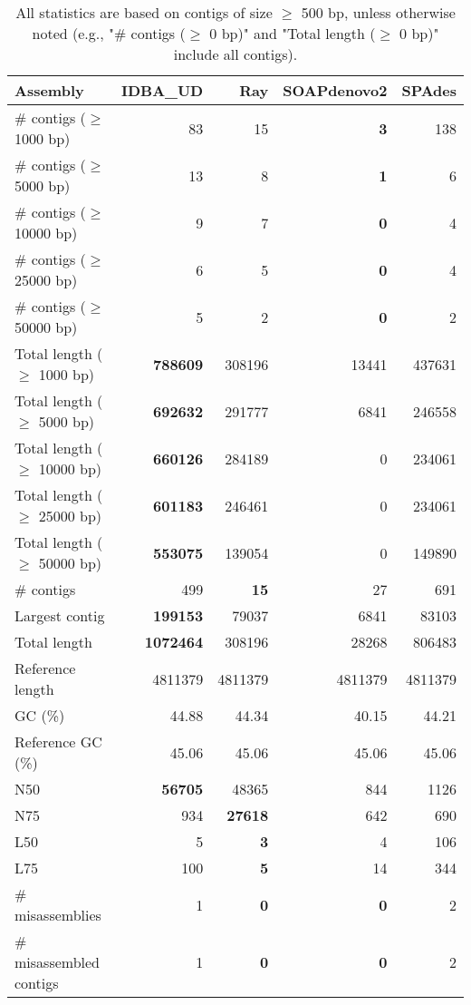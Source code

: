 \documentclass[12pt,a4paper]{article}
\begin{document}
\begin{table}[ht]
\begin{center}
\caption{All statistics are based on contigs of size $\geq$ 500 bp, unless otherwise noted (e.g., "\# contigs ($\geq$ 0 bp)" and "Total length ($\geq$ 0 bp)" include all contigs).}
\begin{tabular}{|l*{4}{|r}|}
\hline
Assembly & IDBA\_UD & Ray & SOAPdenovo2 & SPAdes \\ \hline
\# contigs ($\geq$ 1000 bp) & 83 & 15 & {\bf 3} & 138 \\ \hline
\# contigs ($\geq$ 5000 bp) & 13 & 8 & {\bf 1} & 6 \\ \hline
\# contigs ($\geq$ 10000 bp) & 9 & 7 & {\bf 0} & 4 \\ \hline
\# contigs ($\geq$ 25000 bp) & 6 & 5 & {\bf 0} & 4 \\ \hline
\# contigs ($\geq$ 50000 bp) & 5 & 2 & {\bf 0} & 2 \\ \hline
Total length ($\geq$ 1000 bp) & {\bf 788609} & 308196 & 13441 & 437631 \\ \hline
Total length ($\geq$ 5000 bp) & {\bf 692632} & 291777 & 6841 & 246558 \\ \hline
Total length ($\geq$ 10000 bp) & {\bf 660126} & 284189 & 0 & 234061 \\ \hline
Total length ($\geq$ 25000 bp) & {\bf 601183} & 246461 & 0 & 234061 \\ \hline
Total length ($\geq$ 50000 bp) & {\bf 553075} & 139054 & 0 & 149890 \\ \hline
\# contigs & 499 & {\bf 15} & 27 & 691 \\ \hline
Largest contig & {\bf 199153} & 79037 & 6841 & 83103 \\ \hline
Total length & {\bf 1072464} & 308196 & 28268 & 806483 \\ \hline
Reference length & 4811379 & 4811379 & 4811379 & 4811379 \\ \hline
GC (\%) & 44.88 & 44.34 & 40.15 & 44.21 \\ \hline
Reference GC (\%) & 45.06 & 45.06 & 45.06 & 45.06 \\ \hline
N50 & {\bf 56705} & 48365 & 844 & 1126 \\ \hline
N75 & 934 & {\bf 27618} & 642 & 690 \\ \hline
L50 & 5 & {\bf 3} & 4 & 106 \\ \hline
L75 & 100 & {\bf 5} & 14 & 344 \\ \hline
\# misassemblies & 1 & {\bf 0} & {\bf 0} & 2 \\ \hline
\# misassembled contigs & 1 & {\bf 0} & {\bf 0} & 2 \\ \hline

\end{tabular}
\end{center}
\end{table}
\end{document}
